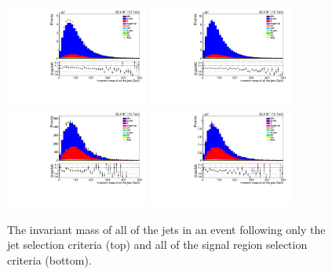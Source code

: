 \begin{figure}[ht]
\centering
\includegraphics[width=0.42\textwidth]{figs/background-estimation/plots/unblinded/prompt_ee_ttbarInc/totalJetMass_NPL_ee_jetSel_ee.pdf}
\includegraphics[width=0.42\textwidth]{figs/background-estimation/plots/unblinded/prompt_mumu_ttbarInc/totalJetMass_NPL_mumu_jetSel_mumu.pdf}
\\
\includegraphics[width=0.42\textwidth]{figs/background-estimation/plots/unblinded/prompt_ee_ttbarInc/totalJetMass_NPL_ee_wMass_ee.pdf}
\includegraphics[width=0.42\textwidth]{figs/background-estimation/plots/unblinded/prompt_mumu_ttbarInc/totalJetMass_NPL_mumu_wMass_mumu.pdf}
\caption{
The invariant mass of all of the jets in an event following only the jet selection criteria (top) and all of the signal region selection criteria (bottom).
}
\label{fig:App_SR_totalJetMass}
\end{figure}


